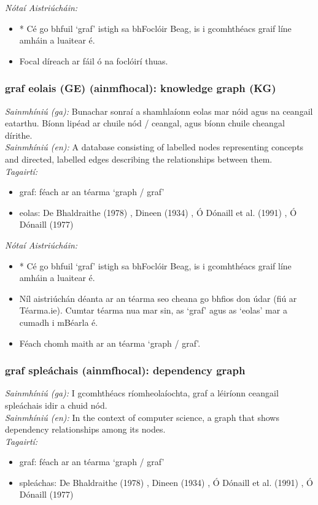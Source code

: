  \noindent \textit{Nótaí Aistriúcháin:}
\begin{itemize}
	\item * Cé go bhfuil `graf' istigh sa bhFoclóir Beag, is i gcomhthéacs graif líne amháin a luaitear é.
	\item Focal díreach ar fáil ó na foclóirí thuas.
\end{itemize}


\subsubsection*{graf eolais (GE) (ainmfhocal): knowledge graph (KG)}
 \noindent \textit{Sainmhíniú (ga):} Bunachar sonraí a shamhlaíonn eolas mar nóid agus na ceangail eatarthu. Bíonn lipéad ar chuile nód / ceangal, agus bíonn chuile cheangal dírithe.
\\
 \noindent \textit{Sainmhíniú (en):} A database consisting of labelled nodes representing concepts and directed, labelled edges describing the relationships between them.
\\
 \noindent \textit{Tagairtí:}
\begin{itemize}
	\item graf: féach ar an téarma `graph / graf'
	\item eolas: De Bhaldraithe (1978) \cite{de-bhaldraithe}, Dineen (1934) \cite{dineen}, Ó Dónaill et al. (1991) \cite{focloir-beag}, Ó Dónaill (1977) \cite{odonaill}
\end{itemize}

 \noindent \textit{Nótaí Aistriúcháin:}
\begin{itemize}
	\item * Cé go bhfuil `graf' istigh sa bhFoclóir Beag, is i gcomhthéacs graif líne amháin a luaitear é.
	\item Níl aistriúchán déanta ar an téarma seo cheana go bhfios don údar (fiú ar Téarma.ie). Cumtar téarma nua mar sin, as `graf' agus as `eolas' mar a cumadh i mBéarla é.
	\item Féach chomh maith ar an téarma `graph / graf'.
\end{itemize}


\subsubsection*{graf spleáchais (ainmfhocal): dependency graph}
 \noindent \textit{Sainmhíniú (ga):} I gcomhthéacs ríomheolaíochta, graf a léiríonn ceangail spleáchais idir a chuid nód.
\\
 \noindent \textit{Sainmhíniú (en):} In the context of computer science, a graph that shows dependency relationships among its nodes.
\\
 \noindent \textit{Tagairtí:}
\begin{itemize}
	\item graf: féach ar an téarma `graph / graf'
	\item spleáchas: De Bhaldraithe (1978) \cite{de-bhaldraithe}, Dineen (1934) \cite{dineen}, Ó Dónaill et al. (1991) \cite{focloir-beag}, Ó Dónaill (1977) \cite{odonaill}
\end{itemize}

